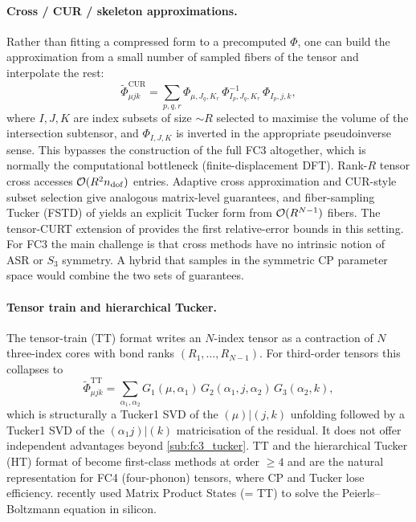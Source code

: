 \paragraph{Cross / CUR / skeleton approximations.} Rather than fitting a compressed form to a
precomputed $\Phi$, one can build the approximation from a small number of sampled fibers of the
tensor and interpolate the rest:
\begin{equation}
  \tilde\Phi_{\mu j k}^{\mathrm{CUR}}
  = \sum_{p,q,r}\Phi_{\mu,J_q,K_r}\,
    \Phi_{I_p,J_q,K_r}^{-1}\,\Phi_{I_p,j,k},
\end{equation}
where $I,J,K$ are index subsets of size $\sim R$ selected to maximise the volume of the
intersection subtensor, and $\Phi_{I,J,K}$ is inverted in the appropriate pseudoinverse sense.
This bypasses the construction of the full FC3 altogether, which is normally the computational
bottleneck (finite-displacement DFT). Rank-$R$ tensor cross
\cite{oseledets_tt-cross_2010, savostyanov_quasioptimality_2014} accesses $\mathcal{O}(R^{2}n_{\mathrm{dof}})$ entries.
Adaptive cross approximation \cite{bebendorf_approximation_2000} and CUR-style subset selection
\cite{goreinov_theory_1997, mahoney_cur_2009} give analogous matrix-level
guarantees, and fiber-sampling Tucker (FSTD) of \citet{caiafa_generalizing_2010} yields an explicit
Tucker form from $\mathcal{O}(R^{N-1})$ fibers. The tensor-CURT extension of
\citet{song_relative_2019} provides the first relative-error bounds in this setting. For
FC3 the main challenge is that cross methods have no intrinsic notion of ASR or $S_3$ symmetry.
A hybrid that samples in the symmetric CP parameter space would combine the two sets of
guarantees.

\paragraph{Tensor train and hierarchical Tucker.} The tensor-train (TT) format
\cite{oseledets_tensor-train_2011} writes an $N$-index tensor as a contraction of $N$ three-index
cores with bond ranks $(R_1,\dots,R_{N-1})$. For third-order tensors this collapses to
\begin{equation}
  \tilde\Phi_{\mu j k}^{\mathrm{TT}}
  = \sum_{\alpha_1,\alpha_2} G_1(\mu,\alpha_1)\,
    G_2(\alpha_1,j,\alpha_2)\,G_3(\alpha_2,k),
\end{equation}
which is structurally a Tucker1 SVD of the $(\mu)|(j,k)$ unfolding followed by a Tucker1 SVD of
the $(\alpha_1 j)|(k)$ matricisation of the residual. It does not offer independent advantages
beyond \cref{sub:fc3_tucker}. TT and the hierarchical Tucker (HT) format of
\citet{hackbusch_tensor_2019} become first-class methods at order
$\ge 4$ and are the natural representation for FC4 (four-phonon) tensors, where CP and Tucker
lose efficiency. \citet{lee_solving_2026} recently used Matrix Product States (= TT) to solve the
Peierls--Boltzmann equation in silicon.

